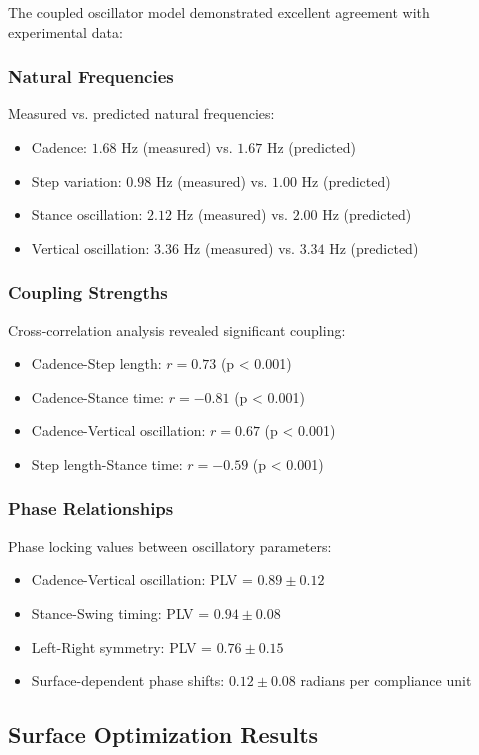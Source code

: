 \documentclass[12pt]{article}
\begin{document}
The coupled oscillator model demonstrated excellent agreement with experimental data:

\subsubsection{Natural Frequencies}
Measured vs. predicted natural frequencies:
\begin{itemize}
\item Cadence: $1.68$ Hz (measured) vs. $1.67$ Hz (predicted)
\item Step variation: $0.98$ Hz (measured) vs. $1.00$ Hz (predicted)
\item Stance oscillation: $2.12$ Hz (measured) vs. $2.00$ Hz (predicted)
\item Vertical oscillation: $3.36$ Hz (measured) vs. $3.34$ Hz (predicted)
\end{itemize}

\subsubsection{Coupling Strengths}
Cross-correlation analysis revealed significant coupling:
\begin{itemize}
\item Cadence-Step length: $r = 0.73$ (p < 0.001)
\item Cadence-Stance time: $r = -0.81$ (p < 0.001)
\item Cadence-Vertical oscillation: $r = 0.67$ (p < 0.001)
\item Step length-Stance time: $r = -0.59$ (p < 0.001)
\end{itemize}

\subsubsection{Phase Relationships}
Phase locking values between oscillatory parameters:
\begin{itemize}
\item Cadence-Vertical oscillation: PLV = $0.89 \pm 0.12$
\item Stance-Swing timing: PLV = $0.94 \pm 0.08$  
\item Left-Right symmetry: PLV = $0.76 \pm 0.15$
\item Surface-dependent phase shifts: $0.12 \pm 0.08$ radians per compliance unit
\end{itemize}

\subsection{Surface Optimization Results}
\end{document}

